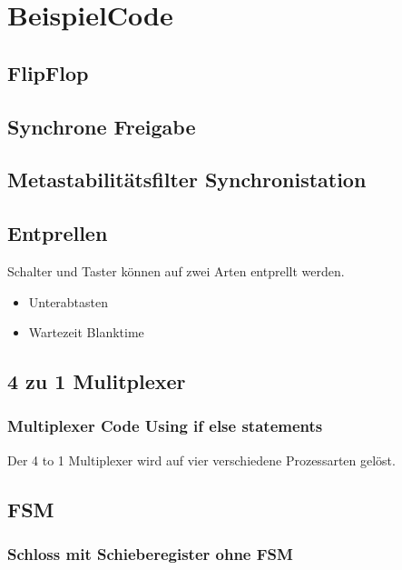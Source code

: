 \section{BeispielCode}
\subsection{FlipFlop}


\subsection{Synchrone Freigabe}


\subsection{Metastabilitätsfilter Synchronistation}


\subsection{Entprellen}
Schalter und Taster können auf zwei Arten entprellt werden.\\
\begin{itemize}
\item Unterabtasten
\item Wartezeit Blanktime
\end{itemize}


\subsection{4 zu 1 Mulitplexer}

\subsubsection{Multiplexer Code Using if else statements}
Der 4 to 1 Multiplexer wird auf vier verschiedene Prozessarten gelöst.


\subsection{FSM}

\subsubsection{Schloss mit Schieberegister ohne FSM}


